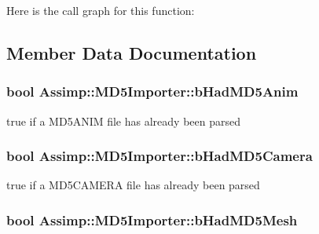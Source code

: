 Here is the call graph for this function\+:




\subsection{Member Data Documentation}
\hypertarget{class_assimp_1_1_m_d5_importer_a15d640ebdbd30f65a78ed04a25da64a0}{
\subsubsection[{b\+Had\+M\+D5\+Anim}]{\setlength{\rightskip}{0pt plus 5cm}bool Assimp\+::\+M\+D5\+Importer\+::b\+Had\+M\+D5\+Anim\hspace{0.3cm}{\ttfamily [protected]}}}\label{class_assimp_1_1_m_d5_importer_a15d640ebdbd30f65a78ed04a25da64a0}
true if a M\+D5\+A\+N\+I\+M file has already been parsed \hypertarget{class_assimp_1_1_m_d5_importer_afd03d113a5cff8de28877ebf2afd244c}{
\subsubsection[{b\+Had\+M\+D5\+Camera}]{\setlength{\rightskip}{0pt plus 5cm}bool Assimp\+::\+M\+D5\+Importer\+::b\+Had\+M\+D5\+Camera\hspace{0.3cm}{\ttfamily [protected]}}}\label{class_assimp_1_1_m_d5_importer_afd03d113a5cff8de28877ebf2afd244c}
true if a M\+D5\+C\+A\+M\+E\+R\+A file has already been parsed \hypertarget{class_assimp_1_1_m_d5_importer_a846f72291cf0405d2706ddd760c6cd50}{
\subsubsection[{b\+Had\+M\+D5\+Mesh}]{\setlength{\rightskip}{0pt plus 5cm}bool Assimp\+::\+M\+D5\+Importer\+::b\+Had\+M\+D5\+Mesh\hspace{0.3cm}{\ttfamily [protected]}}}\label{class_assimp_1_1_m_d5_importer_a846f72291cf0405d2706ddd760c6cd50}
